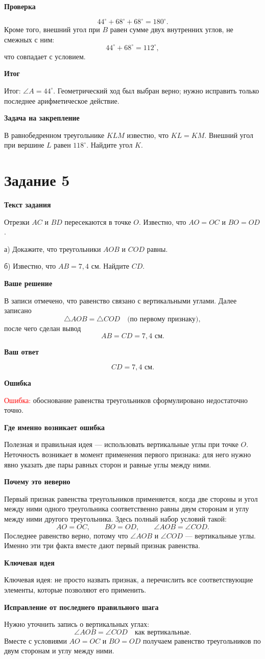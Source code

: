 \documentclass[12pt,a4paper]{article}
\newcommand{\tasktitle}[1]{%
  \phantomsection\label{task:#1}%
  \section*{Задание #1}%
}
\newcommand{\errorlabel}[1]{\textcolor{red}{Ошибка:} #1}
\newcommand{\keyidea}[1]{\textcolor{blue!60!black}{Ключевая идея:} #1}
\newcommand{\finalnote}[1]{\textcolor{teal!60!black}{Итог:} #1}
\newcommand{\subhead}[1]{\vspace{0.3em}\textbf{#1}\par}
\begin{document}
\subhead{Проверка}
\[
44^\circ+68^\circ+68^\circ=180^\circ.
\]
Кроме того, внешний угол при $B$ равен сумме двух внутренних углов,
не смежных с ним:
\[
44^\circ+68^\circ=112^\circ,
\]
что совпадает с условием.

\subhead{Итог}
\finalnote{$\angle A=44^\circ$.
Геометрический ход был выбран верно; нужно исправить только последнее
арифметическое действие.}

\subhead{Задача на закрепление}
В равнобедренном треугольнике $KLM$ известно, что $KL=KM$.
Внешний угол при вершине $L$ равен $118^\circ$.
Найдите угол $K$.

\newpage
\tasktitle{5}

\subhead{Текст задания}
Отрезки $AC$ и $BD$ пересекаются в точке $O$.
Известно, что $AO=OC$ и $BO=OD$.

а) Докажите, что треугольники $AOB$ и $COD$ равны.

б) Известно, что $AB=7{,}4$ см. Найдите $CD$.

\subhead{Ваше решение}
В записи отмечено, что равенство связано с вертикальными углами.
Далее записано
\[
\triangle AOB=\triangle COD
\quad \text{(по первому признаку)},
\]
после чего сделан вывод
\[
AB=CD=7{,}4\text{ см}.
\]

\subhead{Ваш ответ}
\[
CD=7{,}4\text{ см}.
\]

\subhead{Ошибка}
\errorlabel{обоснование равенства треугольников сформулировано недостаточно точно.}

\subhead{Где именно возникает ошибка}
Полезная и правильная идея --- использовать вертикальные углы при точке $O$.
Неточность возникает в момент применения первого признака:
для него нужно явно указать две пары равных сторон и равные углы между ними.

\subhead{Почему это неверно}
Первый признак равенства треугольников применяется, когда две стороны
и угол между ними одного треугольника соответственно равны двум сторонам
и углу между ними другого треугольника.
Здесь полный набор условий такой:
\[
AO=OC,\qquad BO=OD,\qquad \angle AOB=\angle COD.
\]
Последнее равенство верно, потому что $\angle AOB$ и $\angle COD$
--- вертикальные углы.
Именно эти три факта вместе дают первый признак равенства.

\subhead{Ключевая идея}
\keyidea{не просто назвать признак, а перечислить все соответствующие
элементы, которые позволяют его применить.}

\subhead{Исправление от последнего правильного шага}
Нужно уточнить запись о вертикальных углах:
\[
\angle AOB=\angle COD \quad \text{как вертикальные}.
\]
Вместе с условиями $AO=OC$ и $BO=OD$ получаем равенство треугольников
по двум сторонам и углу между ними.
\end{document}
